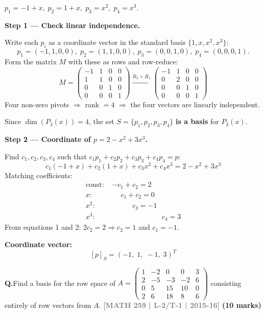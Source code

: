 \documentclass[12pt,a3paper]{article}
\newcommand{\yr}[1]{\hfill\textcolor{gray}{\small\textbf{[#1]}}}
\newcommand{\mk}[1]{\textcolor{orange!70!black}{\small\textbf{(#1 marks)}}}
\newcounter{qnum}
\newcommand{\Q}[1]{%
  \needspace{4\baselineskip}
  \refstepcounter{qnum}
  \vspace{6pt}
  \noindent\textbf{Q\theqnum.}\enspace #1\par
}
\begin{document}
\begin{tcolorbox}[enhanced,breakable,colback=cC!4,colframe=cC,
  boxrule=0.8pt,arc=5pt,
  title={\textbf{Answer}},
  fonttitle=\bfseries\color{white},colbacktitle=cC]

$p_1=-1+x,\;p_2=1+x,\;p_3=x^2,\;p_4=x^3$.

\textbf{Step 1 --- Check linear independence.}

Write each $p_i$ as a coordinate vector in the standard basis $\{1,x,x^2,x^3\}$:
\[
p_1=(-1,1,0,0),\;p_2=(1,1,0,0),\;p_3=(0,0,1,0),\;p_4=(0,0,0,1).
\]
Form the matrix $M$ with these as rows and row-reduce:
\[
M=\begin{pmatrix}-1&1&0&0\\1&1&0&0\\0&0&1&0\\0&0&0&1\end{pmatrix}
\xrightarrow{R_2+R_1}
\begin{pmatrix}-1&1&0&0\\0&2&0&0\\0&0&1&0\\0&0&0&1\end{pmatrix}
\]
Four non-zero pivots $\Rightarrow$ rank $=4$ $\Rightarrow$ the four vectors are linearly independent.

Since $\dim(P_3(x))=4$, the set $S=\{p_1,p_2,p_3,p_4\}$ \textbf{is a basis} for $P_3(x)$.

\medskip
\textbf{Step 2 --- Coordinate of $p=2-x^2+3x^3$.}

Find $c_1,c_2,c_3,c_4$ such that $c_1p_1+c_2p_2+c_3p_3+c_4p_4=p$:
\[
c_1(-1+x)+c_2(1+x)+c_3x^2+c_4x^3 = 2-x^2+3x^3
\]
Matching coefficients:
\begin{align*}
  \text{const: } &-c_1+c_2 = 2\\
  x: &\phantom{-}c_1+c_2 = 0\\
  x^2: &\phantom{-c_1+}c_3 = -1\\
  x^3: &\phantom{-c_1+c_2+c_3+}c_4 = 3
\end{align*}
From equations 1 and 2: $2c_2=2\Rightarrow c_2=1$ and $c_1=-1$.

\textbf{Coordinate vector:}
\[
  [p]_S = (-1,\;1,\;-1,\;3)^T
\]
\end{tcolorbox}

\Q{Find a basis for the row space of 
$A = \begin{pmatrix} 1 & -2 & 0 & 0 & 3 \\ 2 & -5 & -3 & -2 & 6 \\ 0 & 5 & 15 & 10 & 0 \\ 2 & 6 & 18 & 8 & 6 \end{pmatrix}$ 
consisting entirely of row vectors from $A$.
\yr{MATH 259 | L-2/T-1 | 2015-16} \mk{10}}
\end{document}
